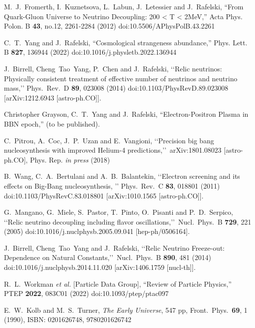 \documentclass[Universe,article,submit,moreauthors,pdftex]{Definitions/mdpi}
\begin{document}
\begin{thebibliography}{99}

M.~J.~Fromerth, I.~Kuznetsova, L.~Labun, J.~Letessier and J.~Rafelski,
``From Quark-Gluon Universe to Neutrino Decoupling: 200 < T < 2MeV,''
Acta Phys. Polon. B \textbf{43}, no.12, 2261-2284 (2012)
doi:10.5506/APhysPolB.43.2261

C.~T.~Yang and J.~Rafelski,
``Cosmological strangeness abundance,''
Phys. Lett. B \textbf{827}, 136944 (2022)
doi:10.1016/j.physletb.2022.136944

J.~Birrell, Cheng~Tao~Yang, P.~Chen and J.~Rafelski,
\lq\lq Relic neutrinos: Physically consistent treatment of effective number of neutrinos and neutrino mass,\rq\rq
Phys.\ Rev.\ D {\bf 89}, 023008 (2014)
doi:10.1103/PhysRevD.89.023008
[arXiv:1212.6943 [astro-ph.CO]].

Christopher Grayson, C.~T.~Yang and J.~Rafelski,
``Electron-Positron Plasma in BBN epoch,'' (to be published).

C.~Pitrou, A.~Coc, J.~P.~Uzan and E.~Vangioni,
\lq\lq Precision big bang nucleosynthesis with improved Helium-4 predictions,\rq\rq\ 
arXiv:1801.08023 [astro-ph.CO], Phys. Rep. {\it in press} (2018)


B.~Wang, C.~A.~Bertulani and A.~B.~Balantekin,
\lq\lq Electron screening and its effects on Big-Bang nucleosynthesis, \rq\rq
Phys.\ Rev.\ C {\bf 83}, 018801 (2011)
doi:10.1103/PhysRevC.83.018801
[arXiv:1010.1565 [astro-ph.CO]].

G.~Mangano, G.~Miele, S.~Pastor, T.~Pinto, O.~Pisanti and P.~D.~Serpico,
\lq\lq Relic neutrino decoupling including flavor oscillations,\rq\rq\
Nucl.\ Phys.\ B {\bf 729}, 221 (2005)
doi:10.1016/j.nuclphysb.2005.09.041
[hep-ph/0506164].

 J.~Birrell, Cheng~Tao~Yang and J.~Rafelski,
\lq\lq Relic Neutrino Freeze-out: Dependence on Natural Constants,\rq\rq\
 Nucl.\ Phys.\ B {\bf 890}, 481 (2014)
 doi:10.1016/j.nuclphysb.2014.11.020
 [arXiv:1406.1759 [nucl-th]].


R.~L.~Workman \textit{et al.} [Particle Data Group],
``Review of Particle Physics,''
PTEP \textbf{2022}, 083C01 (2022)
doi:10.1093/ptep/ptac097

E.~W.~Kolb and M.~S.~Turner,
\emph{The Early Universe},
547 pp, Front.\ Phys.\ {\bf 69}, 1 (1990),
ISBN: 0201626748, 9780201626742


\end{thebibliography}
\end{document}
